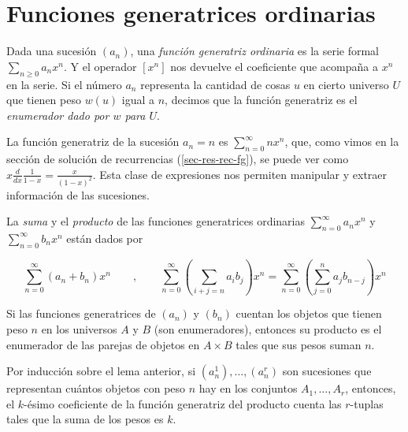 \section{Funciones generatrices
ordinarias}\label{section-ordinarias}
\begin{definition}
\label{definition-combi-006}
Dada una sucesión $(a_n)$, una \emph{función
generatriz ordinaria} es la serie formal $
\sum_{n\geq0}a_nx^n$. Y el operador $[x^n]$
nos devuelve el coeficiente que acompaña a
$x^n$ en la serie. Si el número $a_n$
representa la cantidad de cosas $u$ en cierto
universo $U$ que tienen peso $w(u)$ igual a
$n$, decimos que la función generatriz es el
\emph{enumerador dado por $w$ para $U$}.
\end{definition}
\begin{example}
\label{example-combi-001}
La función generatriz de la sucesión $a_n =
n$ es $ \sum_{n = 0}^\infty nx^n$, que, como
vimos en la sección de
solución de
recurrencias (\ref{sec-res-rec-fg}), se puede
ver como $x
\frac{d}{dx} \frac{1}{1-x} =
\frac{x}{(1-x)^2}$. Esta clase de expresiones
nos permiten manipular y extraer información
de las sucesiones.
\end{example}
\begin{definition}
\label{definition-combi-007}
La \emph{suma} y el \emph{producto} de las
funciones generatrices ordinarias $ \sum_{n =
0}^\infty a_nx^n$ y $ \sum_{n = 0}^\infty
b_nx^n$ están dados por

$$
 \sum_{n = 0}^\infty (a_n + b_n)x^n \qquad,
\qquad \sum_{n = 0}^\infty  \left( \sum_{i +
j = n}a_ib_j \right)x^n =  \sum_{n =
0}^\infty  \left( \sum_{j = 0}^na_jb_{n-j}
\right)x^n
$$

\end{definition}
\begin{lemma}
\label{lemma-combi-001}
Si las funciones generatrices de $(a_n)$ y
$(b_n)$ cuentan los objetos que tienen peso
$n$ en los universos $A$ y $B$ (son
enumeradores),
entonces su producto es el enumerador de las
parejas de objetos en $A\times B$ tales que
sus pesos suman $n$.
\end{lemma}
\begin{corollary}
\label{corollary-combi-001}
Por inducción sobre el lema anterior,
si $(a^1_n), \ldots,(a^r_n)$ son
sucesiones que representan cuántos objetos
con peso $n$ hay en los conjuntos $A_1,
\ldots,A_r$, entonces, el $k$-ésimo
coeficiente de la función generatriz del
producto cuenta las $r$-tuplas tales que la
suma de los pesos es $k$.
\end{corollary}
